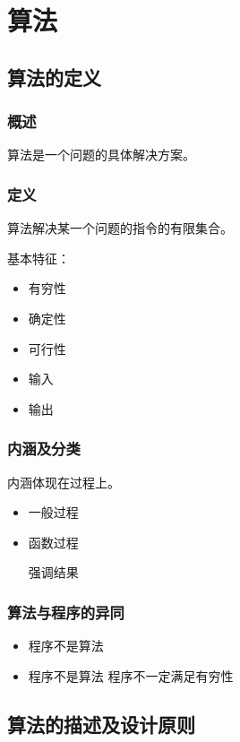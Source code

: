 \documentclass[AutoFakeBold]{LZUThesis2007}
\begin{document}
\chapter{算法}
	\section{算法的定义}
		\subsection{概述}

			算法是一个问题的具体解决方案。

		\subsection{定义}

			算法解决某一个问题的指令的有限集合。

			基本特征：
				\begin{itemize}
					\item 有穷性
					\item 确定性
					\item 可行性
					\item 输入
					\item 输出
				\end{itemize}

		\subsection{内涵及分类}
			内涵体现在过程上。
				\begin{itemize}
					\item 一般过程
					\item 函数过程

						强调结果

				\end{itemize}

		\subsection{算法与程序的异同}
				\begin{itemize}
					\item 程序不是算法
					\item 程序不是算法 程序不一定满足有穷性
				\end{itemize}

	\section{算法的描述及设计原则}
\end{document}

